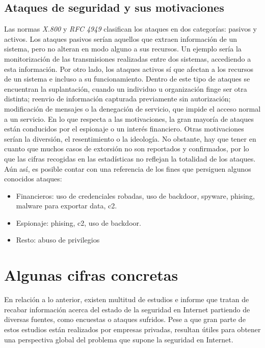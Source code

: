 \subsection{Ataques de seguridad y sus motivaciones}
Las normas \textit{X.800} y \textit {RFC 4949} clasifican los ataques en dos categorías: pasivos y activos. Los ataques pasivos serían aquellos que extraen información de un sistema, pero no alteran en modo alguno a sus recursos. Un ejemplo sería la monitorización de las transmisiones realizadas entre dos sistemas, accediendo a esta información. Por otro lado, los ataques activos sí que afectan a los recursos de un sistema e incluso a su funcionamiento. Dentro de este tipo de ataques se encuentran la suplantación, cuando un individuo u organización finge ser otra distinta; reenvio de información capturada previamente sin autorización; modificación de mensajes o la denegación de servicio, que impide el acceso normal a un servicio\cite{Stallings2016}.
En lo que respecta a las motivaciones, la gran mayoría de ataques están conducidos por el espionaje o un interés financiero. Otras motivaciones serían la diversión, el resentimiento o la ideología. No obstante, hay que tener en cuanto que muchos casos de extorsión no son reportados y confirmados, por lo que las cifras recogidas en las estadísticas no reflejan la totalidad de los ataques. Aún así, es posible contar con una referencia de los fines que persiguen algunos conocidos ataques\cite{DBIR2017}: 
\begin{itemize}
	\item Financieros: uso de credenciales robadas, uso de backdoor, spyware, phising, malware para exportar data, c2.
	\item Espionaje: phising, c2, uso de backdoor.
	\item Resto: abuso de privilegios
\end{itemize}


\section{Algunas cifras concretas}
En relación a lo anterior, existen multitud de estudios e informe que tratan de recabar información acerca del estado de la seguridad en Internet partiendo de diversas fuentes, como encuestas o ataques sufridos. Pese a que gran parte de estos estudios están realizados por empresas privadas, resultan útiles para obtener una perspectiva global del problema que supone la seguridad en Internet.


